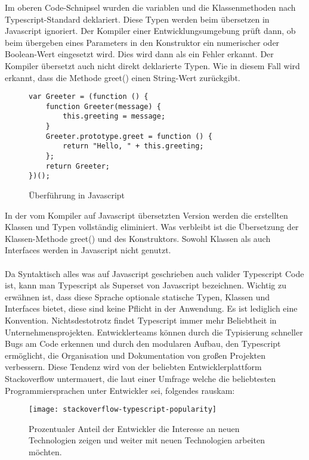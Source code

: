 Im oberen Code-Schnipsel wurden die variablen und die Klassenmethoden nach Typescript-Standard deklariert. Diese Typen werden beim übersetzen in Javascript ignoriert. Der Kompiler einer Entwicklungsumgebung prüft dann, ob beim übergeben eines Parameters in den Konstruktor ein numerischer oder Boolean-Wert eingesetzt wird. Dies wird dann als ein Fehler erkannt. Der Kompiler übersetzt auch nicht direkt deklarierte Typen. Wie in diesem Fall wird erkannt, dass die Methode greet() einen String-Wert zurückgibt.

\begin{figure}[t]
\begin{lstlisting}
var Greeter = (function () {
    function Greeter(message) {
        this.greeting = message;
    }
    Greeter.prototype.greet = function () {
        return "Hello, " + this.greeting;
    };
    return Greeter;
})(); 
\end{lstlisting}
\caption{Überführung in Javascript \cite{typescript-example}}
\end{figure}
In der vom Kompiler auf Javascript übersetzten Version werden die erstellten Klassen und Typen vollständig eliminiert. Was verbleibt ist die Übersetzung der Klassen-Methode greet() und des Konstruktors. Sowohl Klassen als auch Interfaces werden in Javascript nicht genutzt.
\\\\
Da Syntaktisch alles was auf Javascript geschrieben auch valider Typescript Code ist, kann man Typescript als Superset von Javascript bezeichnen.
Wichtig zu erwähnen ist, dass diese Sprache optionale statische Typen, Klassen und Interfaces bietet, diese sind keine Pflicht in der Anwendung. Es ist lediglich eine Konvention.
Nichtsdestotrotz findet Typescript immer mehr Beliebtheit in Unternehmensprojekten. Entwicklerteams können durch die Typisierung schneller Bugs am Code erkennen und durch den modularen Aufbau, den Typescript ermöglicht, die Organisation und Dokumentation von großen Projekten verbessern. Diese Tendenz wird von der beliebten Entwicklerplattform Stackoverflow untermauert, die laut einer Umfrage welche die beliebtesten Programmiersprachen unter Entwickler sei, folgendes rauskam:

\begin{figure}[H]
\centering
\texttt{[image: stackoverflow-typescript-popularity]}
\caption{Prozentualer Anteil der Entwickler die Interesse an neuen Technologien zeigen und weiter mit neuen Technologien arbeiten möchten. \cite{typescript-survey}}
\end{figure}

